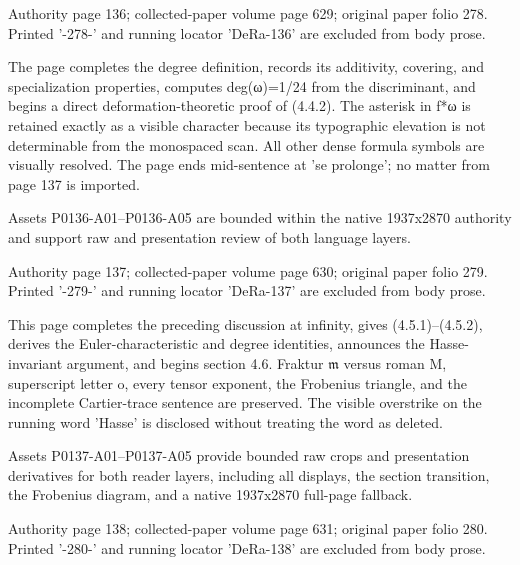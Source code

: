 \documentclass[11pt,a4paper]{article}
\begin{document}
\par\medskip
\hypertarget{D018-P0136}{}
\par\smallskip
Authority page 136; collected-paper volume page 629; original paper folio 278. Printed '-278-' and running locator 'DeRa-136' are excluded from body prose.

The page completes the degree definition, records its additivity, covering, and specialization properties, computes deg(ω)=1/24 from the discriminant, and begins a direct deformation-theoretic proof of (4.4.2). The asterisk in f*ω is retained exactly as a visible character because its typographic elevation is not determinable from the monospaced scan. All other dense formula symbols are visually resolved. The page ends mid-sentence at 'se prolonge'; no matter from page 137 is imported.

Assets P0136-A01--P0136-A05 are bounded within the native 1937x2870 authority and support raw and presentation review of both language layers.


\par\medskip
\hypertarget{D018-P0137}{}
\par\smallskip
Authority page 137; collected-paper volume page 630; original paper folio 279. Printed '-279-' and running locator 'DeRa-137' are excluded from body prose.

This page completes the preceding discussion at infinity, gives (4.5.1)--(4.5.2), derives the Euler-characteristic and degree identities, announces the Hasse-invariant argument, and begins section 4.6. Fraktur \ensuremath{\mathfrak{m}} versus roman M, superscript letter o, every tensor exponent, the Frobenius triangle, and the incomplete Cartier-trace sentence are preserved. The visible overstrike on the running word 'Hasse' is disclosed without treating the word as deleted.

Assets P0137-A01--P0137-A05 provide bounded raw crops and presentation derivatives for both reader layers, including all displays, the section transition, the Frobenius diagram, and a native 1937x2870 full-page fallback.


\par\medskip
\hypertarget{D018-P0138}{}
\par\smallskip
Authority page 138; collected-paper volume page 631; original paper folio 280. Printed '-280-' and running locator 'DeRa-138' are excluded from body prose.
\end{document}
